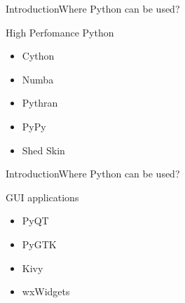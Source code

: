 \documentclass[10pt]{beamer}
\begin{document}
\begin{frame}{Introduction}{Where Python can be used?}
	
	\begin{block}{High Perfomance Python}
		\begin{itemize}
			\item Cython
			
			\item Numba
			
			\item Pythran
			
			\item PyPy
			
			\item Shed Skin
		\end{itemize}
		
	\end{block}
\end{frame}

\begin{frame}{Introduction}{Where Python can be used?}
	
	\begin{block}{GUI applications}
		\begin{itemize}
			\item PyQT
			
			\item PyGTK
			
			\item Kivy
			
			\item wxWidgets
	
		\end{itemize}
		
	\end{block}
\end{frame}
\end{document}
